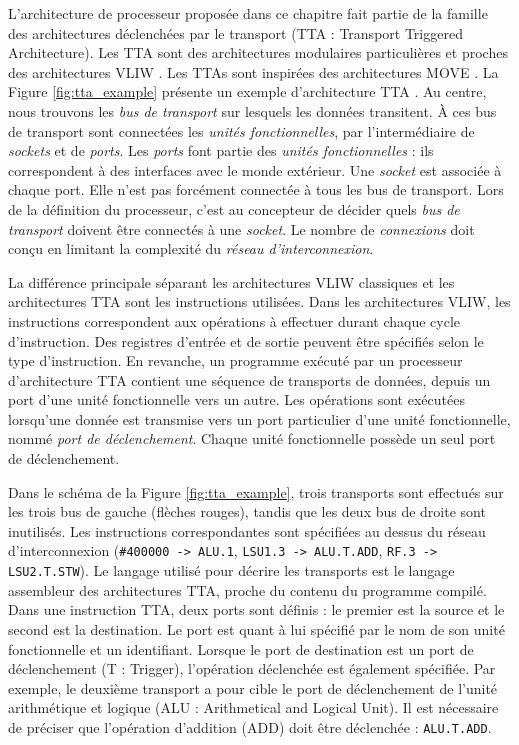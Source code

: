 L'architecture de processeur proposée dans ce chapitre fait partie de la famille des architectures déclenchées par le transport (TTA : Transport Triggered Architecture). Les TTA sont des architectures modulaires particulières et proches des architectures VLIW \cite{corporaal_microprocessor_1997}. Les TTAs sont inspirées des architectures MOVE \cite{1051344}. La Figure \ref{fig:tta_example} présente un exemple d'architecture TTA \cite{pekka_phd_2012}. Au centre, nous trouvons les \textit{bus de transport} sur lesquels les données transitent. \`A ces bus de transport sont connectées les \textit{unités fonctionnelles}, par l'intermédiaire de \textit{sockets} et de \textit{ports}. Les \textit{ports} font partie des \textit{unités fonctionnelles} : ils correspondent à des interfaces avec le monde extérieur. Une \textit{socket} est associée à chaque port. Elle n'est pas forcément connectée à tous les bus de transport. Lors de la définition du processeur, c'est au concepteur de décider quels \textit{bus de transport} doivent être connectés à une \textit{socket}. Le nombre de \textit{connexions} doit conçu en limitant la complexité du \textit{réseau d'interconnexion}.

La différence principale séparant les architectures VLIW classiques et les architectures TTA sont les instructions utilisées. Dans les architectures VLIW, les instructions correspondent aux opérations à effectuer durant chaque cycle d'instruction. Des registres d'entrée et de sortie peuvent être spécifiés selon le type d'instruction. En revanche, un programme exécuté par un processeur d'architecture TTA contient une séquence de transports de données, depuis un port d'une unité fonctionnelle vers un autre. Les opérations sont exécutées lorsqu'une donnée est transmise vers un port particulier d'une unité fonctionnelle, nommé \textit{port de déclenchement}. Chaque unité fonctionnelle possède un seul port de déclenchement.

Dans le schéma de la Figure \ref{fig:tta_example}, trois transports sont effectués sur les trois bus de gauche (flèches rouges), tandis que les deux bus de droite sont inutilisés. Les instructions correspondantes sont spécifiées au dessus du réseau d'interconnexion (\texttt{\#400000 -> ALU.1}, \texttt{LSU1.3 -> ALU.T.ADD}, \texttt{RF.3 -> LSU2.T.STW}). Le langage utilisé pour décrire les transports est le langage assembleur des architectures TTA, proche du contenu du programme compilé. Dans une instruction TTA, deux ports sont définis : le premier est la source et le second est la destination. Le port est quant à lui spécifié par le nom de son unité fonctionnelle et un identifiant. Lorsque le port de destination est un port de déclenchement (T : Trigger), l'opération déclenchée est également spécifiée. Par exemple, le deuxième transport a pour cible le port de déclenchement de l'unité arithmétique et logique (ALU : Arithmetical and Logical Unit). Il est nécessaire de préciser que l'opération d'addition (ADD) doit être déclenchée : \texttt{ALU.T.ADD}.

